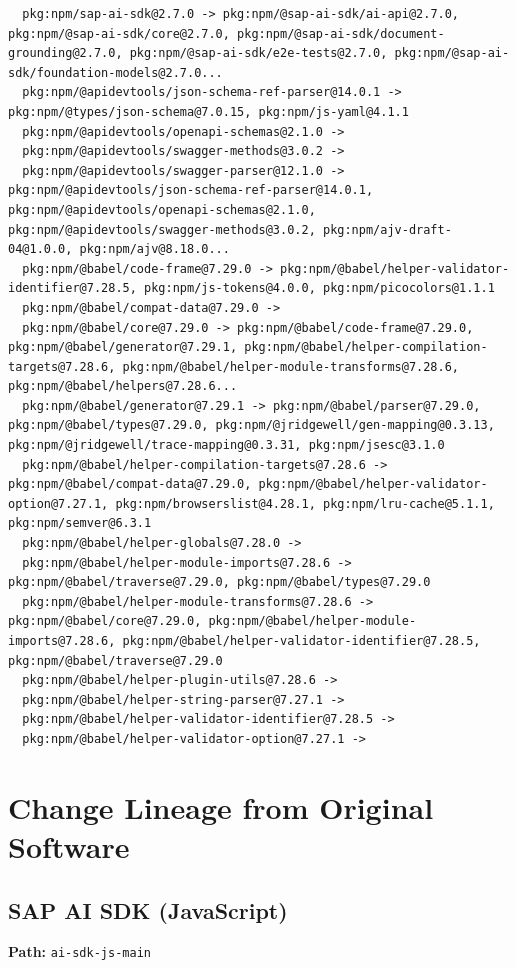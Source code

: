 \documentclass[11pt]{article}
\begin{document}
\begin{verbatim}
  pkg:npm/sap-ai-sdk@2.7.0 -> pkg:npm/@sap-ai-sdk/ai-api@2.7.0, pkg:npm/@sap-ai-sdk/core@2.7.0, pkg:npm/@sap-ai-sdk/document-grounding@2.7.0, pkg:npm/@sap-ai-sdk/e2e-tests@2.7.0, pkg:npm/@sap-ai-sdk/foundation-models@2.7.0...
  pkg:npm/@apidevtools/json-schema-ref-parser@14.0.1 -> pkg:npm/@types/json-schema@7.0.15, pkg:npm/js-yaml@4.1.1
  pkg:npm/@apidevtools/openapi-schemas@2.1.0 -> 
  pkg:npm/@apidevtools/swagger-methods@3.0.2 -> 
  pkg:npm/@apidevtools/swagger-parser@12.1.0 -> pkg:npm/@apidevtools/json-schema-ref-parser@14.0.1, pkg:npm/@apidevtools/openapi-schemas@2.1.0, pkg:npm/@apidevtools/swagger-methods@3.0.2, pkg:npm/ajv-draft-04@1.0.0, pkg:npm/ajv@8.18.0...
  pkg:npm/@babel/code-frame@7.29.0 -> pkg:npm/@babel/helper-validator-identifier@7.28.5, pkg:npm/js-tokens@4.0.0, pkg:npm/picocolors@1.1.1
  pkg:npm/@babel/compat-data@7.29.0 -> 
  pkg:npm/@babel/core@7.29.0 -> pkg:npm/@babel/code-frame@7.29.0, pkg:npm/@babel/generator@7.29.1, pkg:npm/@babel/helper-compilation-targets@7.28.6, pkg:npm/@babel/helper-module-transforms@7.28.6, pkg:npm/@babel/helpers@7.28.6...
  pkg:npm/@babel/generator@7.29.1 -> pkg:npm/@babel/parser@7.29.0, pkg:npm/@babel/types@7.29.0, pkg:npm/@jridgewell/gen-mapping@0.3.13, pkg:npm/@jridgewell/trace-mapping@0.3.31, pkg:npm/jsesc@3.1.0
  pkg:npm/@babel/helper-compilation-targets@7.28.6 -> pkg:npm/@babel/compat-data@7.29.0, pkg:npm/@babel/helper-validator-option@7.27.1, pkg:npm/browserslist@4.28.1, pkg:npm/lru-cache@5.1.1, pkg:npm/semver@6.3.1
  pkg:npm/@babel/helper-globals@7.28.0 -> 
  pkg:npm/@babel/helper-module-imports@7.28.6 -> pkg:npm/@babel/traverse@7.29.0, pkg:npm/@babel/types@7.29.0
  pkg:npm/@babel/helper-module-transforms@7.28.6 -> pkg:npm/@babel/core@7.29.0, pkg:npm/@babel/helper-module-imports@7.28.6, pkg:npm/@babel/helper-validator-identifier@7.28.5, pkg:npm/@babel/traverse@7.29.0
  pkg:npm/@babel/helper-plugin-utils@7.28.6 -> 
  pkg:npm/@babel/helper-string-parser@7.27.1 -> 
  pkg:npm/@babel/helper-validator-identifier@7.28.5 -> 
  pkg:npm/@babel/helper-validator-option@7.27.1 -> 
\end{verbatim}

\newpage
\section{Change Lineage from Original Software}

\subsection{SAP AI SDK (JavaScript)}
\textbf{Path:} \texttt{ai-sdk-js-main}
\end{document}
